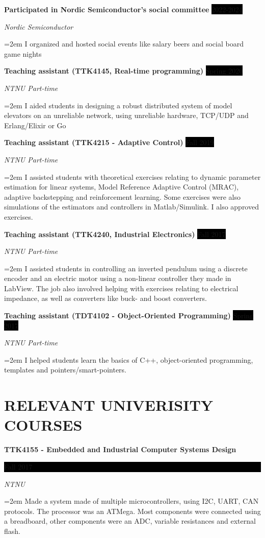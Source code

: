 \documentclass[paper=a4,fontsize=11pt,norsk]{scrartcl} %
\newcommand{\NewPart}[1]{\section*{\uppercase{#1}}}
\newcommand{\EducationEntry}[4]{
		\noindent \textbf{#1} \hfill      %
		\colorbox{Black}{%
			\parbox{6em}{%
			\hfill\color{White}#2}} \par  %
		\noindent \textit{#3} \par        %
		\noindent\hangindent=2em\hangafter=0 \small #4 %
		\normalsize \par}
\newcommand{\WorkEntry}[4]{				  %
		\noindent \textbf{#1} \hfill      %
		\colorbox{Black}{\color{White}#2} \par  %
		\noindent \textit{#3} \par              %
		\noindent\hangindent=2em\hangafter=0 \small #4 %
		\normalsize \par}
\begin{document}



\WorkEntry{Participated in Nordic Semiconductor's social committee}{2022-2024}{Nordic Semiconductor}
{I organized and hosted social events like salary beers and social board game nights}

\WorkEntry{Teaching assistant (TTK4145, Real-time programming)}{Spring 2020}{NTNU Part-time}
{I aided students in designing a robust distributed system of model elevators on an unreliable network, using unreliable hardware, TCP/UDP and Erlang/Elixir or Go}

\WorkEntry{Teaching assistant (TTK4215 - Adaptive Control)}{Fall 2019}{NTNU Part-time}
{I assisted students with theoretical exercises relating to dynamic parameter estimation for linear systems, Model Reference Adaptive Control (MRAC), adaptive backstepping and reinforcement learning. Some exercises were also simulations of the estimators and controllers in Matlab/Simulink. I also approved exercises.
}


\WorkEntry{Teaching assistant (TTK4240, Industrial Electronics)}{Fall 2017}{NTNU Part-time}
{I assisted students in controlling an inverted pendulum using a discrete encoder and an electric motor using a non-linear controller they made in LabView. The job also involved helping with exercises relating to electrical impedance, as well as converters like buck- and boost converters.
}

\WorkEntry{Teaching assistant (TDT4102 - Object-Oriented Programming)}{Spring 2017}{NTNU Part-time}
{I helped students learn the basics of C++, object-oriented programming, templates and pointers/smart-pointers.
}


\NewPart{Relevant univerisity Courses}{}


\EducationEntry{TTK4155 - Embedded and Industrial Computer Systems Design}{Fall 2017}{NTNU}
{Made a system made of multiple microcontrollers, using I2C, UART, CAN protocols. The processor was an ATMega. Most components were connected using a breadboard, other components were an ADC, variable resistances and external flash.
}
\end{document}
